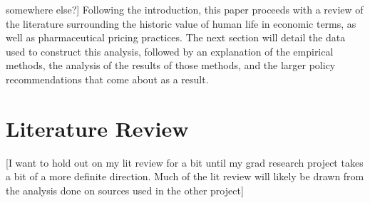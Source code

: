 \documentclass[12pt,english]{article} \usepackage{mathptmx}
\begin{document}
somewhere else?] Following the introduction, this paper proceeds with 
a review of the literature surrounding the historic value of human 
life in economic terms, as well as pharmaceutical pricing practices. 
The next section will detail the data used to construct this 
analysis, followed by an explanation of the empirical methods, the 
analysis of the results of those methods, and the larger policy 
recommendations that come about as a result. \section{Literature 
Review}\label{sec:litreview} [I want to hold out on my lit review for 
a bit until my grad research project takes a bit of a more definite 
direction. Much of the lit review will likely be drawn from the 
analysis done on sources used in the other project] 
\end{document}
